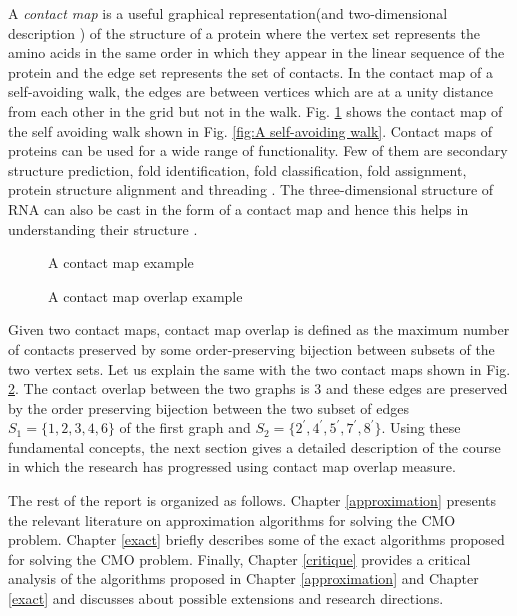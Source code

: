 A {\it contact map} is a useful graphical representation(and two-dimensional description ) of the structure of a protein where the vertex set represents the amino acids in the same order in which they appear in the linear sequence of the protein and the edge set represents the set of contacts. In the contact map of a self-avoiding walk, the edges are between vertices which are at a unity distance from each other in the grid but not in the walk.
Fig. \ref{fig:A contact Map Example} shows the contact map of the self avoiding walk shown in Fig. \ref{fig:A self-avoiding walk}.
Contact maps of proteins can be used for a wide range of functionality. Few of them are secondary structure prediction, fold identification, fold classification, fold assignment, protein structure alignment and threading \citep{zhang08}. The three-dimensional structure of RNA can also be cast in the form of a contact map and hence this helps in understanding their structure \citep{zhang08}.

\begin{figure}[ht]
\centering
 
 \caption{A contact map example}
 \label{fig:A contact Map Example}
\end{figure}
\begin{figure}[ht]
\centering
 
 
\caption{A contact map overlap example}
\label{fig:A contact Map overlap Example}
\end{figure}

Given two contact maps, contact map overlap is defined as the maximum number of contacts preserved by some order-preserving bijection between subsets of the two vertex sets. Let us explain the same with the two contact maps shown in Fig. \ref{fig:A contact Map overlap Example}. The contact overlap between the two graphs is $3$ and these edges are preserved by the order preserving bijection between the two subset of edges $S_1 =\{1,2,3,4,6\}$ of the first graph and $S_2 =\{2^{\prime},4^{\prime},5^{\prime},7^{\prime},8^{\prime}\}$. Using these fundamental concepts, the next section gives a detailed description of the course in which the research has progressed using contact map overlap measure.

The rest of the report is organized as follows. Chapter \ref{approximation} presents the relevant
literature on approximation algorithms for solving the CMO problem.
Chapter \ref{exact} briefly describes some of the exact algorithms proposed
for solving the CMO problem. Finally, Chapter \ref{critique} provides a critical analysis of the
algorithms proposed in Chapter \ref{approximation} and Chapter \ref{exact} and discusses about
possible extensions and research directions. 